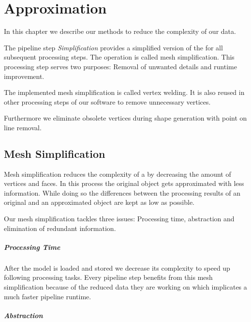 \documentclass[../ClassicThesis.tex]{subfiles}
\begin{document}
\chapter{Approximation}\label{ch:approximation}

\newcommand\myNotes[1]{\textcolor{red}{#1}}


In this chapter we describe our methods to reduce the complexity of our data.

The pipeline step \emph{Simplification} provides a simplified version of the {\threedmodel} for all subsequent processing steps. The operation is called mesh simplification. This processing step serves two purposes: Removal of unwanted details and runtime improvement.

The implemented mesh simplification is called vertex welding. It is also reused in other processing steps of our software to remove unnecessary vertices.

Furthermore we eliminate obsolete vertices during shape generation with point on line removal.


\section{Mesh Simplification}


Mesh simplification reduces the complexity of a {\threedmodel} by decreasing the amount of vertices and faces. In this process the original object gets approximated with less information. While doing so the differences between the processing results of an original and an approximated object are kept as low as possible.

Our mesh simplification tackles three issues: Processing time, abstraction and elimination of redundant information.

\paragraph*{Processing Time}

After the model is loaded and stored we decrease its complexity to speed up following processing tasks. Every pipeline step benefits from this mesh simplification because of the reduced data they are working on which implicates a much faster pipeline runtime.

\paragraph*{Abstraction}
\end{document}
